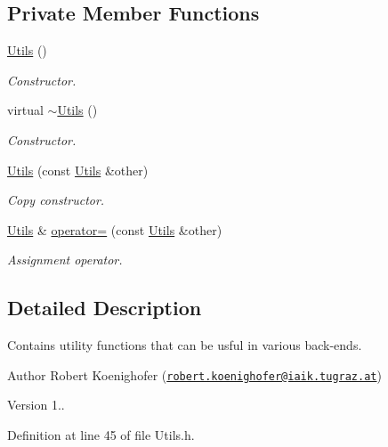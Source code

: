 \subsection*{Private Member Functions}
\begin{DoxyCompactItemize}
\item 
\hyperlink{classUtils_a452e78692c87ed5c7c993b6c6ac4981a}{Utils} ()
\begin{DoxyCompactList}\small\item\em Constructor. \end{DoxyCompactList}\item 
virtual \hyperlink{classUtils_a0d842a927296003dd7088fc1e4e2a367}{$\sim$\-Utils} ()
\begin{DoxyCompactList}\small\item\em Constructor. \end{DoxyCompactList}\item 
\hyperlink{classUtils_a80726f8ec2ed2707a8bfd4fd355ef27a}{Utils} (const \hyperlink{classUtils}{Utils} \&other)
\begin{DoxyCompactList}\small\item\em Copy constructor. \end{DoxyCompactList}\item 
\hyperlink{classUtils}{Utils} \& \hyperlink{classUtils_a0ed61b802f94ec15000c458e9aae4f19}{operator=} (const \hyperlink{classUtils}{Utils} \&other)
\begin{DoxyCompactList}\small\item\em Assignment operator. \end{DoxyCompactList}\end{DoxyCompactItemize}


\subsection{Detailed Description}
Contains utility functions that can be usful in various back-\/ends. 

\begin{DoxyAuthor}{Author}
Robert Koenighofer (\href{mailto:robert.koenighofer@iaik.tugraz.at}{\tt robert.\-koenighofer@iaik.\-tugraz.\-at}) 
\end{DoxyAuthor}
\begin{DoxyVersion}{Version}
1.. 
\end{DoxyVersion}


Definition at line 45 of file Utils.\-h.



